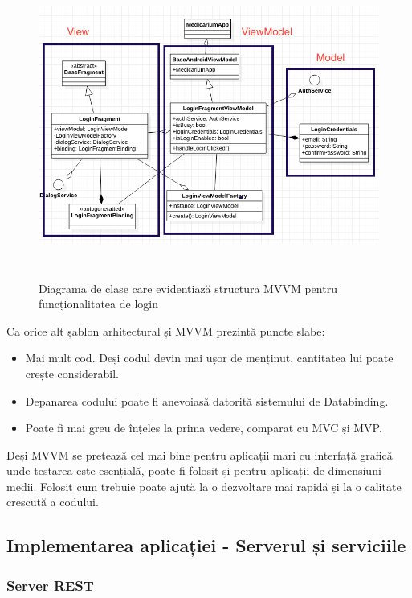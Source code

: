 \documentclass[12pt]{article}
\begin{document}
\begin{figure}[H]
    \centering
    \includegraphics[width=15cm,height=10cm]{mvvmclase.png}
    \caption{Diagrama de clase care evidentiază structura MVVM pentru funcționalitatea de login}
    \end{figure}

Ca orice alt șablon arhitectural și MVVM prezintă puncte slabe:
\begin{itemize}
    \item Mai mult cod. Deși codul devin mai ușor de menținut, cantitatea lui
    poate crește considerabil.
    \item Depanarea codului poate fi anevoiasă datorită sistemului de Databinding.
    \item Poate fi mai greu de înțeles la prima vedere, comparat cu MVC și MVP.
\end{itemize}

Deși MVVM se pretează cel mai bine pentru aplicații mari cu interfață grafică unde testarea este
esențială, poate fi folosit și pentru aplicații de dimensiuni medii. Folosit cum trebuie
poate ajută la o dezvoltare mai rapidă și la o calitate crescută a codului.

\subsection{Implementarea aplicației - Serverul și serviciile}

\subsubsection{Server REST}
\end{document}
